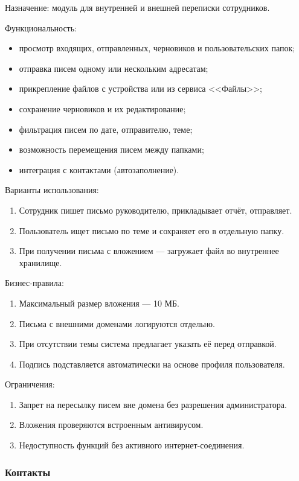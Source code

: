 Назначение: модуль для внутренней и внешней переписки сотрудников.

Функциональность:
\begin{itemize}
  \item просмотр входящих, отправленных, черновиков и пользовательских папок;
  \item отправка писем одному или нескольким адресатам;
  \item прикрепление файлов с устройства или из сервиса <<Файлы>>;
  \item сохранение черновиков и их редактирование;
  \item фильтрация писем по дате, отправителю, теме;
  \item возможность перемещения писем между папками;
  \item интеграция с контактами (автозаполнение).
\end{itemize}

Варианты использования:
\begin{enumerate}
  \item Сотрудник пишет письмо руководителю, прикладывает отчёт, отправляет.
  \item Пользователь ищет письмо по теме и сохраняет его в отдельную папку.
  \item При получении письма с вложением — загружает файл во внутреннее хранилище.
\end{enumerate}

Бизнес-правила:
\begin{enumerate}
  \item Максимальный размер вложения — 10 МБ.
  \item Письма с внешними доменами логируются отдельно.
  \item При отсутствии темы система предлагает указать её перед отправкой.
  \item Подпись подставляется автоматически на основе профиля пользователя.
\end{enumerate}

Ограничения:
\begin{enumerate}
  \item Запрет на пересылку писем вне домена без разрешения администратора.
  \item Вложения проверяются встроенным антивирусом.
  \item Недоступность функций без активного интернет-соединения.
\end{enumerate}

\subsubsection{Контакты}


